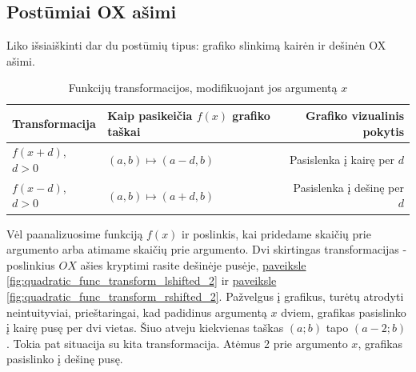 \documentclass{tufte-handout}
\begin{document}
\subsection{Postūmiai OX ašimi}\label{sec:translation_OX_axis}

Liko išsiaiškinti dar du postūmių tipus: grafiko slinkimą kairėn ir dešinėn OX
ašimi.

\begin{table}[!htpb]
  \centering
  \begin{tabular}{
    l | %
    >{\raggedleft\arraybackslash}p{3cm} | %
    r	%
    }
    \toprule
    {Transformacija}  & {Kaip pasikeičia $f(x)$ grafiko taškai}
                      & {Grafiko vizualinis pokytis}            \\
    \midrule
    {$f(x+d)$, $d>0$} & {$(a,b)\mapsto(a-d, b)$}
                      & {Pasislenka į kairę per $d$}            \\
    {$f(x-d)$, $d>0$} & {$(a,b)\mapsto(a+d, b)$}
                      & {Pasislenka į dešinę per $d$}           \\
    \bottomrule
  \end{tabular}
  \vspace{16pt} %
  \caption{Funkcijų transformacijos, modifikuojant jos argumentą $x$}
  \label{tbl:after_transformations}
\end{table}

Vėl paanalizuosime funkciją $f(x)$ ir poslinkis, kai pridedame skaičių prie
argumento
arba atimame skaičių prie argumento. Dvi skirtingas transformacijas -
poslinkius $OX$ ašies kryptimi rasite dešinėje pusėje,
\hyperref[fig:quadratic_func_transform_lshifted_2]{paveiksle
  \ref*{fig:quadratic_func_transform_lshifted_2}} ir
\hyperref[fig:quadratic_func_transform_rshifted_2]{paveiksle
  \ref*{fig:quadratic_func_transform_rshifted_2}}. Pažvelgus į grafikus, turėtų
atrodyti neintuityviai, prieštaringai, kad padidinus argumentą $x$ dviem,
grafikas pasislinko į kairę pusę per dvi vietas. Šiuo atveju kiekvienas taškas
$(a;b)$ tapo $(a-2;b)$. Tokia pat situacija su kita transformacija. Atėmus 2
prie argumento $x$, grafikas pasislinko į dešinę pusę.
\end{document}
